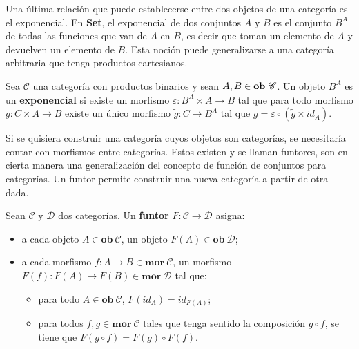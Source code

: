 Una última relación que puede establecerse entre dos objetos de una categoría es el exponencial. En \textbf{Set}, el exponencial de dos conjuntos $A$ y $B$ es el conjunto $B^A$ de todas las funciones que van de $A$ en $B$, es decir que toman un elemento de $A$ y devuelven un elemento de $B$. Esta noción puede generalizarse a una categoría arbitraria que tenga productos cartesianos.

\begin{definition}[Exponencial]
Sea $\mathscr{C}$ una categoría con productos binarios y sean $A,B \in \text{\bf ob} \ \mathscr{C}$. Un objeto $B^A$ es un \textbf{exponencial} si existe un morfismo $\varepsilon : B^A \times A \rightarrow B$ tal que para todo morfismo $g : C \times A \rightarrow B$ existe un único morfismo $\tilde{g} : C \rightarrow B^A$ tal que $g = \varepsilon \circ (\tilde{g} \times id_A)$.
\end{definition}

Si se quisiera construir una categoría cuyos objetos son categorías, se necesitaría contar con morfismos entre categorías. Estos existen y se llaman funtores, son en cierta manera una generalización del concepto de función de conjuntos para categorías. Un funtor permite construir una nueva categoría a partir de otra dada.
 
\begin{definition}[Funtor]\label{def:funtor}
Sean $\mathscr{C}$ y $\mathscr{D}$ dos categorías. Un \textbf{funtor} $\mathit{F} : \mathscr{C} \rightarrow \mathscr{D}$ asigna:
\begin{itemize}[noitemsep,label=$\blacktriangleright$]
	\item a cada objeto $A \in \mathbf{ob} \ \mathscr{C}$, un objeto $\mathit{F}(A) \in \mathbf{ob} \ \mathscr{D}$;
	\item a cada morfismo $f : A \rightarrow B \in \mathbf{mor} \ \mathscr{C}$, un morfismo $\mathit{F}(f) : \mathit{F}(A) \rightarrow \mathit{F}(B) \in \mathbf{mor} \ \mathscr{D}$ tal que: 
	\begin{itemize}[noitemsep,label=$\bullet$]
		\item para todo $A \in \mathbf{ob} \ \mathscr{C}$, $\mathit{F}(id_A) = id_{\mathit{F}(A)}$;
		\item para todos $f,g \in \mathbf{mor} \ \mathscr{C}$ tales que tenga sentido la composición $g \circ f$, se tiene que $\mathit{F}(g \circ f) = \mathit{F}(g) \circ \mathit{F}(f)$.
	\end{itemize}
\end{itemize}
\end{definition}

